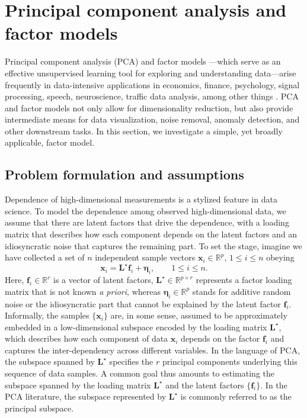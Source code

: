
\section{Principal component analysis and factor models}
\label{sec:PCA}



Principal component analysis (PCA) and factor models  \citep{jolliffe1986principal,lawley1962factor,fan2020statistical}---which serve as an effective unsupervised learning tool for exploring and understanding data---arise frequently in data-intensive applications in economics,  finance, psychology, signal processing, speech, neuroscience, traffic data analysis, among other things \citep{stock2002forecasting,mccrae1992introduction, scharf1991svd, chen2015reduced, balzano2018streaming,fan2020robust}.
PCA and factor models not only allow for dimensionality reduction,
but also provide intermediate means for data visualization, noise removal, anomaly detection, and other downstream tasks.
In this section, we investigate a simple, yet broadly applicable, factor model.



\subsection{Problem formulation and assumptions}
\label{sec:formulation-PCA}

Dependence of high-dimensional measurements is a stylized feature in data science.  To model the dependence among observed high-dimensional data, we assume that there are latent factors that drive the dependence, with a loading matrix that describes how each component depends on the latent factors and an idiosyncratic noise that captures the remaining part.
To set the stage, imagine we have collected a set of $n$ independent sample vectors
$\bm{x}_{i} \in \mathbb{R}^{p}$, $1\leq i\leq n$ obeying
%
\begin{equation}
	\bm{x}_{i}=\bm{L}^{\star}\bm{f}_{i}+\bm{\eta}_{i},\qquad1\leq i\leq n.
	\label{eq:samples-PCA}
\end{equation}
%
Here, $\bm{f}_{i}\in\mathbb{R}^{r}$ is a vector of latent factors, $\bm{L}^{\star}\in\mathbb{R}^{p\times r}$ represents a factor
loading matrix that is not known {\em a priori}, whereas $\bm{\eta}_{i}\in\mathbb{R}^{p}$
stands for additive random noise or the idiosyncratic part that cannot be explained by the latent factor $\bm{f}_i$.
Informally, the samples $\{\bm{x}_{i}\}$ are, in some sense, assumed to be approximately embedded in a low-dimensional subspace encoded by the loading matrix $\bm{L}^{\star}$,
which describes how each component of data $\bm{x}_{i}$ depends on the factor $\bm f_i$ and captures the inter-dependency across different variables.
In the language of PCA, the subspace spanned by $\bm{L}^{\star}$ specifies the $r$ principal components underlying this sequence of data samples.
A common goal thus amounts to estimating the subspace spanned by the loading matrix $\bm{L}^{\star}$ and the latent factors $\{\bm{f}_i\}$. 
In the PCA literature, the subspace  represented by $\bm{L}^{\star}$ is commonly referred  to as the principal subspace.



